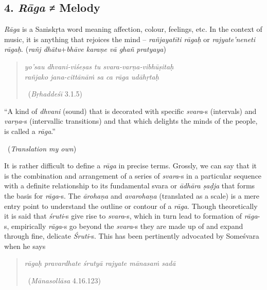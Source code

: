 \subsection*{4. \textit{Rāga} ≠ Melody}

\textit{Rāga} is a Saṁskṛta word meaning affection, colour, feelings, etc. In the context of music, it is anything that rejoices the mind – \textit{rañjayatīti rāgaḥ} or \textit{rajyate’neneti rāgaḥ}. (\textit{rañj dhātu}+\textit{bhāve karaṇe vā ghañ pratyaya})

\begin{verse}
\textit{yo’sau dhvani-viśeṣas tu svara-varṇa-vibhūṣitaḥ }\\ \textit{rañjako jana-cittānāṁ sa ca rāga udāhṛtaḥ } 

~\hfill (\textit{Bṛhaddeśī} 3.1.5)
\end{verse}

\begin{myquote}
“A kind of \textit{dhvani} (sound) that is decorated with specific \textit{svara}-s (intervals) and \textit{varṇa}-s (intervallic transitions) and that which delights the minds of the people, is called a \textit{rāga}.” 

~\hfill (\textit{Translation my own})
\end{myquote}

It is rather difficult to define a \textit{rāga} in precise terms. Grossly, we can say that it is the combination and arrangement of a series of \textit{svara}-s in a particular sequence with a definite relationship to its fundamental svara or \textit{ādhāra ṣaḍja} that forms the basis for \textit{rāga}-s. The \textit{ārohaṇa} and \textit{avarohaṇa} (translated as a scale) is a mere entry point to understand the outline or contour of a \textit{rāga}. Though theoretically it is said that \textit{śruti}-s give rise to \textit{svara}-s, which in turn lead to formation of \textit{rāga}-s, empirically \textit{rāga}-s go beyond the \textit{svara}-s they are made up of and expand through fine, delicate \textit{Śruti}-s. This has been pertinently advocated by Someśvara when he says

\begin{verse}
\textit{rāgaḥ pravardhate śrutyā rajyate mānasaṁ sadā} 

~\hfill (\textit{Mānasollāsa} 4.16.123)
\end{verse}

